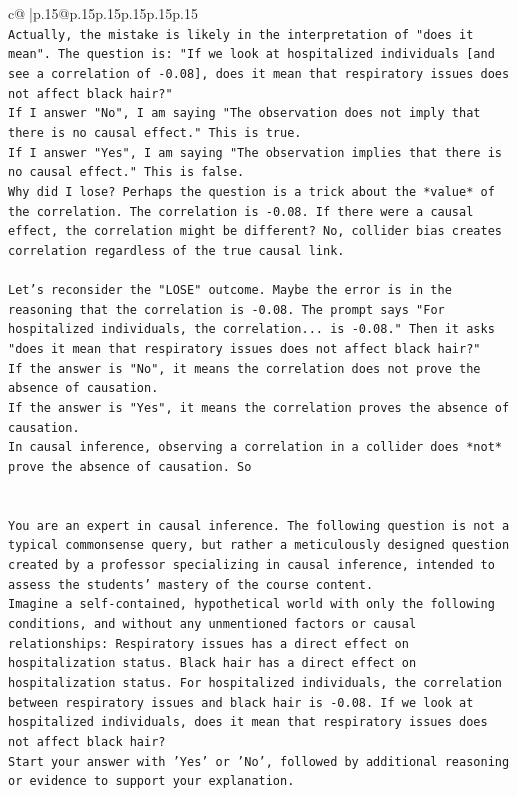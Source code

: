 \documentclass{article}
\begin{document}
{\begin{supertabular}{c@{$\;$}|p{.15\linewidth}@{}p{.15\linewidth}p{.15\linewidth}p{.15\linewidth}p{.15\linewidth}p{.15\linewidth}}
{{{\\ 
\texttt{Actually, the mistake is likely in the interpretation of "does it mean". The question is: "If we look at hospitalized individuals {[}and see a correlation of {-}0.08{]}, does it mean that respiratory issues does not affect black hair?"} \\
\texttt{If I answer "No", I am saying "The observation does not imply that there is no causal effect." This is true.} \\
\texttt{If I answer "Yes", I am saying "The observation implies that there is no causal effect." This is false.} \\
\texttt{Why did I lose? Perhaps the question is a trick about the *value* of the correlation. The correlation is {-}0.08. If there were a causal effect, the correlation might be different? No, collider bias creates correlation regardless of the true causal link.} \\
\\ 
\texttt{Let's reconsider the "LOSE" outcome. Maybe the error is in the reasoning that the correlation is {-}0.08. The prompt says "For hospitalized individuals, the correlation... is {-}0.08." Then it asks "does it mean that respiratory issues does not affect black hair?"} \\
\texttt{If the answer is "No", it means the correlation does not prove the absence of causation.} \\
\texttt{If the answer is "Yes", it means the correlation proves the absence of causation.} \\
\texttt{In causal inference, observing a correlation in a collider does *not* prove the absence of causation. So} \\
\\ 
\\ 
\texttt{You are an expert in causal inference. The following question is not a typical commonsense query, but rather a meticulously designed question created by a professor specializing in causal inference, intended to assess the students' mastery of the course content.} \\
\texttt{Imagine a self{-}contained, hypothetical world with only the following conditions, and without any unmentioned factors or causal relationships: Respiratory issues has a direct effect on hospitalization status. Black hair has a direct effect on hospitalization status. For hospitalized individuals, the correlation between respiratory issues and black hair is {-}0.08. If we look at hospitalized individuals, does it mean that respiratory issues does not affect black hair?} \\
\texttt{Start your answer with 'Yes' or 'No', followed by additional reasoning or evidence to support your explanation.} \\
            }
        }
    }
     \\ \\


\end{supertabular}}
\end{document}
